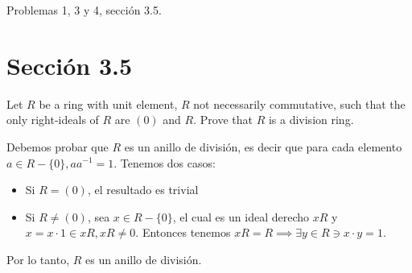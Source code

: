 





Problemas 1, 3 y 4, sección 3.5.
\section*{Sección 3.5}
\begin{problema}[Problema 1]
    Let $R$ be a ring with unit element, $R$ not necessarily commutative, such that the only right-ideals of $R$ are $(0)$ and $R$. Prove that $R$ is a division ring.
   \begin{dem}
        Debemos probar que $R$ es un anillo de división, es decir que para cada elemento $a\in R-\{0\}, aa^{-1}=1$. Tenemos dos casos:
        \begin{itemize}
            \item Si $R=(0)$, el resultado es trivial
            \item Si $R\neq(0)$, sea $x\in R-\{0\}$, el cual es un ideal derecho $xR$ y $x=x\cdot 1\in xR,xR\neq 0$. Entonces tenemos $xR=R\implies \exists y \in R \ni x\cdot y=1.$
        \end{itemize}
        
        Por lo tanto, $R$ es un anillo de división. 
   \end{dem} 
\end{problema}

